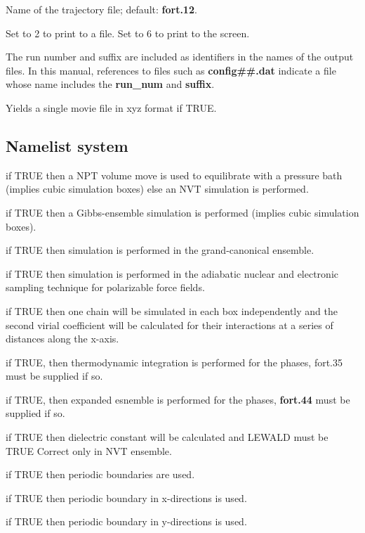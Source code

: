 \documentclass[12pt,letterpaper]{article}
\begin{document}
 Name of the trajectory file;
default: \textbf{fort.12}.

 Set to 2 to print to a file. Set
to 6 to print to the screen.

 The run number and suffix
are included as identifiers in the names of the output
files. In this manual, references to files such as {\bf
  config\#\#.dat} indicate a file whose name includes the
{\bf run\_num} and {\bf suffix}.

 Yields a single movie file in
xyz format if TRUE.

\subsection{Namelist \textbf{system}}
 if TRUE then a NPT volume move is used
to equilibrate with a pressure bath (implies cubic
simulation boxes) else an NVT simulation is performed.

 if TRUE then a Gibbs-ensemble
simulation is performed (implies cubic simulation boxes).

 if TRUE then simulation is performed
in the grand-canonical ensemble.

 if TRUE then simulation is performed in
the adiabatic nuclear and electronic sampling technique for
polarizable force fields.

 if TRUE then one chain will be
simulated in each box independently and the second virial
coefficient will be calculated for their interactions at a
series of distances along the x-axis.

 if TRUE, then thermodynamic
integration is performed for the phases, fort.35 must be
supplied if so.

 if TRUE, then expanded esnemble is
performed for the phases, {\bf fort.44} must be supplied if
so.

 if TRUE then dielectric constant
will be calculated and LEWALD must be TRUE Correct only in
NVT ensemble.

 if TRUE then periodic boundaries are used.

 if TRUE then periodic boundary in x-directions is used.

 if TRUE then periodic boundary in y-directions is used.
\end{document}
